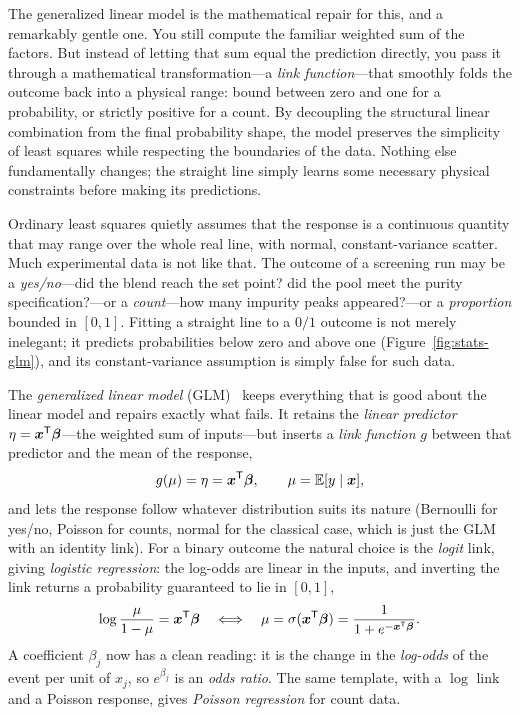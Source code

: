 The generalized linear model is the mathematical repair for this, and a remarkably gentle one.
You still compute the familiar weighted sum of the factors. But instead of letting that sum equal the prediction directly,
you pass it through a mathematical transformation---a \emph{link function}---that smoothly folds
the outcome back into a physical range: bound between zero and one for a probability, or strictly positive for a count.
By decoupling the structural linear combination from the final probability shape, the model preserves the simplicity
of least squares while respecting the boundaries of the data. Nothing else fundamentally changes; the straight line simply learns
some necessary physical constraints before making its predictions.

Ordinary least squares quietly assumes that the response is a continuous
quantity that may range over the whole real line, with normal, constant-variance
scatter. Much experimental data is not like that. The outcome of a screening run
may be a \emph{yes/no}---did the blend reach the set point? did the pool meet the
purity specification?---or a \emph{count}---how many impurity peaks appeared?---or
a \emph{proportion} bounded in $[0,1]$. Fitting a straight line to a $0/1$
outcome is not merely inelegant; it predicts probabilities below zero and above
one (Figure~\ref{fig:stats-glm}), and its constant-variance assumption is simply
false for such data.

The \emph{generalized linear model} (GLM)~\cite{mccullagh} keeps everything that
is good about the linear model and repairs exactly what fails. It retains the
\emph{linear predictor} $\eta = \bm x^{\mathsf{T}}\bm\beta$---the weighted sum of
inputs---but inserts a \emph{link function} $g$ between that predictor and the
mean of the response,
%
\begin{equation}
g(\mu) = \eta = \bm x^{\mathsf{T}}\bm\beta,
\qquad
\mu = \mathbb{E}[y\mid\bm x],
\label{eq:glm}
\end{equation}
%
and lets the response follow whatever distribution suits its nature (Bernoulli
for yes/no, Poisson for counts, normal for the classical case, which is just the
GLM with an identity link). For a binary outcome the natural choice is the
\emph{logit} link, giving \emph{logistic regression}: the log-odds are linear in
the inputs, and inverting the link returns a probability guaranteed to lie in
$[0,1]$,
%
\begin{equation}
\log\frac{\mu}{1-\mu} = \bm x^{\mathsf{T}}\bm\beta
\quad\Longleftrightarrow\quad
\mu = \sigma(\bm x^{\mathsf{T}}\bm\beta)
    = \frac{1}{1+e^{-\bm x^{\mathsf{T}}\bm\beta}} .
\label{eq:logistic}
\end{equation}
%
A coefficient $\beta_j$ now has a clean reading: it is the change in the
\emph{log-odds} of the event per unit of $x_j$, so $e^{\beta_j}$ is an
\emph{odds ratio}. The same template, with a $\log$ link and a Poisson response,
gives \emph{Poisson regression} for count data.

